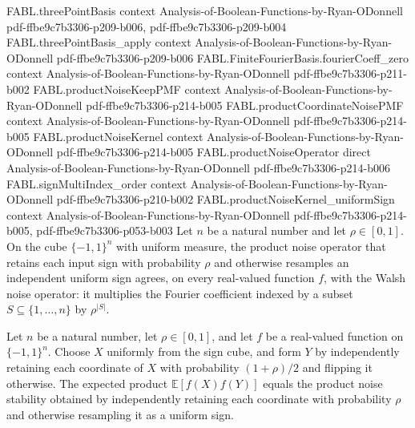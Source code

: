 \begin{theorem}
\proofstep
  {FABL.threePointBasis}
  {context}
  {Analysis-of-Boolean-Functions-by-Ryan-ODonnell}
  {pdf-ffbe9c7b3306-p209-b006,
    pdf-ffbe9c7b3306-p209-b004}
\proofstep
  {FABL.threePointBasis_apply}
  {context}
  {Analysis-of-Boolean-Functions-by-Ryan-ODonnell}
  {pdf-ffbe9c7b3306-p209-b006}
\proofstep
  {FABL.FiniteFourierBasis.fourierCoeff_zero}
  {context}
  {Analysis-of-Boolean-Functions-by-Ryan-ODonnell}
  {pdf-ffbe9c7b3306-p211-b002}
\proofstep
  {FABL.productNoiseKeepPMF}
  {context}
  {Analysis-of-Boolean-Functions-by-Ryan-ODonnell}
  {pdf-ffbe9c7b3306-p214-b005}
\proofstep
  {FABL.productCoordinateNoisePMF}
  {context}
  {Analysis-of-Boolean-Functions-by-Ryan-ODonnell}
  {pdf-ffbe9c7b3306-p214-b005}
\proofstep
  {FABL.productNoiseKernel}
  {context}
  {Analysis-of-Boolean-Functions-by-Ryan-ODonnell}
  {pdf-ffbe9c7b3306-p214-b005}
\proofstep
  {FABL.productNoiseOperator}
  {direct}
  {Analysis-of-Boolean-Functions-by-Ryan-ODonnell}
  {pdf-ffbe9c7b3306-p214-b006}
\proofstep
  {FABL.signMultiIndex_order}
  {context}
  {Analysis-of-Boolean-Functions-by-Ryan-ODonnell}
  {pdf-ffbe9c7b3306-p210-b002}
\proofstep
  {FABL.productNoiseKernel_uniformSign}
  {context}
  {Analysis-of-Boolean-Functions-by-Ryan-ODonnell}
  {pdf-ffbe9c7b3306-p214-b005,
    pdf-ffbe9c7b3306-p053-b003}
Let $n$ be a natural number and let $\rho\in[0,1]$. On the cube $\{-1,1\}^n$
with uniform measure, the product noise operator that retains each input sign with
probability $\rho$ and otherwise resamples an independent uniform sign agrees, on
every real-valued function $f$, with the Walsh noise operator: it multiplies the Fourier
coefficient indexed by a subset $S\subseteq\{1,\ldots,n\}$ by $\rho^{|S|}$.
\end{theorem}

\begin{theorem}
\label{FABL.productNoiseStability_uniformSign_eq_noiseStability}
\leanok
{}
Let $n$ be a natural number, let $\rho\in[0,1]$, and let $f$ be a real-valued
function on $\{-1,1\}^n$. Choose $X$ uniformly from the sign cube, and form $Y$ by
independently retaining each coordinate of $X$ with probability $(1+\rho)/2$ and flipping
it otherwise. The expected product $\mathbb{E}[f(X)f(Y)]$ equals the product noise
stability obtained by independently retaining each coordinate with probability
$\rho$ and otherwise resampling it as a uniform sign.
\end{theorem}

